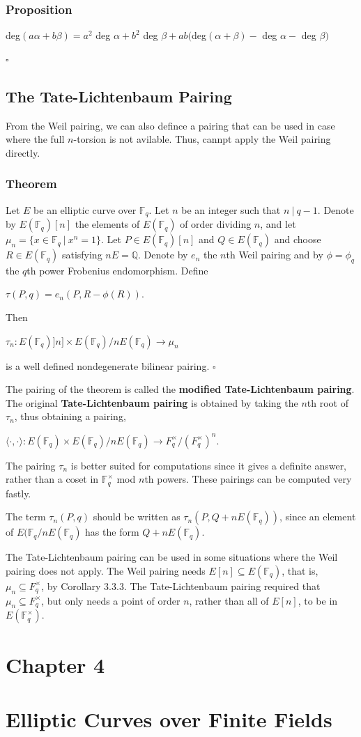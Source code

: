 \documentclass[a4paper, 12pt]{article}
\begin{document}
\subsubsection{Proposition}
\begin{center}
deg$(a\alpha+b\beta) = a^2$ deg $\alpha + b^2$ deg $\beta + ab($deg$(\alpha+\beta) -$ deg $\alpha-$ deg $\beta)$
\end{center}
\par $\square$
\subsection {The Tate-Lichtenbaum Pairing}
From the Weil pairing, we can also defince a pairing that can be used in case where the full $n$-torsion is not avilable. Thus, cannpt apply the Weil pairing directly.
\subsubsection{Theorem}
Let $E$ be an elliptic curve over $\mathbb{F}_q$. Let $n$ be an integer such that $n\: | \: q-1$. Denote by $E(\mathbb{F}_q)[n]$ the elements of $E(\mathbb{F}_q)$ of order dividing $n$, and let $\mu_n=\{x\in\mathbb{F}_q \: |\:x^n=1\}$. Let $P\in E(\mathbb{F}_q)[n]$ and $Q\in E(\mathbb{F}_q)$ and choose $R \in E(\mathbb{F}_q)$ satisfying $nE=\mathbb{Q}$. Denote by $e_n$ the $n$th Weil pairing and by $\phi = \phi_q$ the $q$th power Frobenius endomorphism. Define
\begin{center} $\tau(P,q)=e_n(P,R-\phi(R)).$ \end{center}
Then
\begin{center}
$\tau_n:E(\mathbb{F}_q)]n] \times E(\mathbb{F}_q)/nE(\mathbb{F}_q) \longrightarrow \mu_n$
\end{center}
is a well defined nondegenerate bilinear pairing. $\square$ \par
The pairing of the theorem is called the \textbf{modified Tate-Lichtenbaum pairing}. The original \textbf{Tate-Lichtenbaum pairing} is obtained by taking the $n$th root of $\tau_n$, thus obtaining a pairing,
\begin{center}
$\langle \cdot , \cdot \rangle :E(\mathbb{F}_q) \times E(\mathbb{F}_q)/nE(\mathbb{F}_q) \longrightarrow F_q^{\times}/(F_q^{\times})^n.$
\end{center}
The pairing $\tau_n$ is better suited for computations since it gives a definite answer, rather than a coset in $\mathbb{F}_q^{\times}$ mod $n$th powers. These pairings can be computed very fastly.\par
The term $\tau_n(P,q)$ should be written as $\tau_n(P,Q+nE(\mathbb{F}_q))$, since an element of $E(\mathbb{F}_q/nE(\mathbb{F}_q)$ has the form $Q+nE(\mathbb{F}_q)$. \par 
The Tate-Lichtenbaum pairing can be used in some situations where the Weil pairing does not apply. The Weil pairing needs $E[n] \subseteq E(\mathbb{F}_q)$, that is, $\mu_n \subseteq F_q^{\times}$, by Corollary 3.3.3. The Tate-Lichtenbaum pairing required that $\mu_n \subseteq F_q^{\times}$, but only needs a point of order $n$, rather than all of $E[n]$, to be in $E(\mathbb{F}_q^{\times})$. 
\newpage
\section {Chapter 4}
\section*{Elliptic Curves over Finite Fields}
\end{document}
